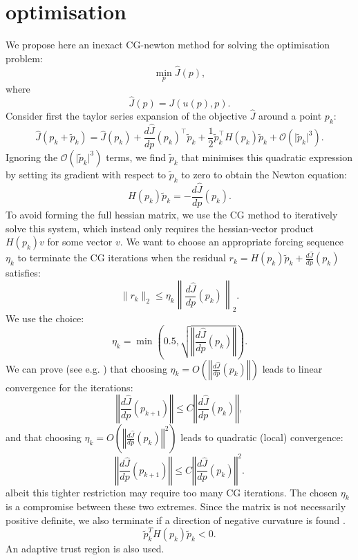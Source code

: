 \section{optimisation}

We propose here an inexact CG-newton method for solving the optimisation problem: %
\begin{equation}
\min_{p} \hat J(p),
\end{equation}
where
\begin{equation}
    \hat J(p) = J(u(p),p).
\end{equation}
Consider first the taylor series expansion of the objective \( \hat J \) around a point \( p_k \):
\begin{equation}
\hat J(p_k + \tilde{p}_k)
= \hat J(p_k)
+ \frac{d\hat J}{dp}(p_k)^{\top} \tilde{p}_k
+ \frac{1}{2} \tilde{p}_k^{\top} H(p_k) \tilde{p}_k
+ \mathcal{O}(\vert \tilde{p}_k \vert^{3}).
\end{equation}
Ignoring the $\mathcal{O}(\vert \tilde{p}_k \vert^{3})$ terms, we find $\tilde{p}_k$ that minimises this quadratic expression by setting its gradient with respect to $\tilde{p}_k$ to zero to obtain the Newton equation:
\begin{equation}
H(p_k)\tilde{p}_k = - \frac{d\hat J}{dp}(p_k).
\end{equation}
To avoid forming the full hessian matrix, we use the CG method to iteratively solve this system, which instead only requires the hessian-vector product \( H(p_k) v \) for some vector \( v \). 
We want to choose an appropriate forcing sequence $\eta_k$ to terminate the CG iterations when the residual \( r_k = H(p_k)\tilde{p}_k + \frac{d\hat J}{dp}(p_k) \) satisfies:
\begin{equation}
\| r_k \|_2 \leq \eta_k \left\| \frac{d\hat J}{dp}(p_k) \right\|_2.
\end{equation}
We use the choice: 
\begin{equation}
\eta_k = \min \left( 0.5, \sqrt{\left\Vert \frac{d\hat J}{dp}(p_k) \right\Vert} \right).
\end{equation}
We can prove (see e.g. \cite{NocedalWright2006}) that choosing $\eta_k = O\left(\left\Vert \frac{d\hat J}{dp}(p_k) \right\Vert\right)$ leads to linear convergence for the iterations:
\begin{equation}
    \left\Vert \frac{d\hat J}{dp}(p_{k+1}) \right\Vert \leq C \left\Vert \frac{d\hat J}{dp}(p_k) \right\Vert,
\end{equation}
and that choosing $\eta_k = O\left(\left\Vert \frac{d\hat J}{dp}(p_k) \right\Vert^2\right)$ leads to quadratic (local) convergence:
\begin{equation}
    \left\Vert \frac{d\hat J}{dp}(p_{k+1}) \right\Vert \leq C \left\Vert \frac{d\hat J}{dp}(p_k) \right\Vert^2.
\end{equation}
albeit this tighter restriction may require too many CG iterations. The chosen $\eta_k$ is a compromise between these two extremes. 
Since the matrix is not necessarily positive definite, we also terminate if a direction of negative curvature is found \cite{NocedalWright2006}.
\begin{equation}
\tilde{p}_k^T H(p_k)\tilde{p}_k < 0.
\end{equation}
An adaptive trust region is also used.